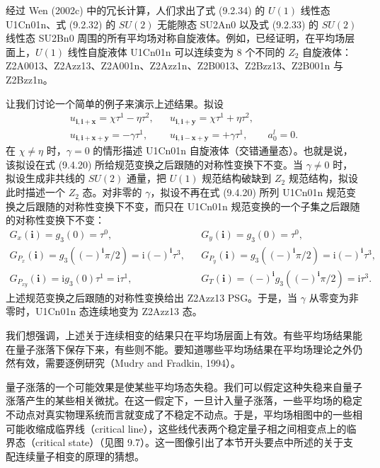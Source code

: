 经过 Wen (2002c) 中的冗长计算，人们求出了式 (9.2.34) 的 $U(1)$ 线性态 U1Cn01n、式 (9.2.32) 的 $SU(2)$ 无能隙态 SU2An0 以及式 (9.2.33) 的 $SU(2)$ 线性态 SU2Bn0 周围的所有平均场对称自旋液体。例如，已经证明，在平均场层面上，$U(1)$ 线性自旋液体 U1Cn01n 可以连续变为 8 个不同的 $Z_{2}$ 自旋液体：Z2A0013、Z2Azz13、Z2A001n、Z2Azz1n、Z2B0013、Z2Bzz13、Z2B001n 与 Z2Bzz1n。

让我们讨论一个简单的例子来演示上述结果。拟设
\begin{equation*}
\begin{array}{rcl}
u_{\pmb{i},\pmb{i}+\pmb{x}}=\chi\tau^{1}-\eta\tau^{2}, & & u_{\pmb{i},\pmb{i}+\pmb{y}}=\chi\tau^{1}+\eta\tau^{2},\\[2pt]
u_{\pmb{i},\pmb{i}+\pmb{x}+\pmb{y}}=-\gamma\tau^{1}, & & u_{\pmb{i},\pmb{i}-\pmb{x}+\pmb{y}}=+\gamma\tau^{1},\qquad a_{0}^{l}=0.
\end{array}
\tag{9.5.1}
\end{equation*}
在 $\chi\neq\eta$ 时，$\gamma=0$ 的情形描述 U1Cn01n 自旋液体（交错通量态）。也就是说，该拟设在式 (9.4.20) 所给规范变换之后跟随的对称性变换下不变。当 $\gamma\neq0$ 时，拟设生成非共线的 $SU(2)$ 通量，把 $U(1)$ 规范结构破缺到 $Z_{2}$ 规范结构，拟设此时描述一个 $Z_{2}$ 态。对非零的 $\gamma$，拟设不再在式 (9.4.20) 所列 U1Cn01n 规范变换之后跟随的对称性变换下不变，而只在 U1Cn01n 规范变换的一个子集之后跟随的对称性变换下不变：
\begin{equation*}
\begin{array}{rcl}
G_{x}(\pmb{i})=g_{3}(0)=\tau^{0}, & & G_{y}(\pmb{i})=g_{3}(0)=\tau^{0},\\[2pt]
G_{P_{x}}(\pmb{i})=g_{3}((-)^{\pmb{i}}\pi/2)=\mathrm{i}(-)^{\pmb{i}}\tau^{3}, & & G_{P_{y}}(\pmb{i})=g_{3}((-)^{\pmb{i}}\pi/2)=\mathrm{i}(-)^{\pmb{i}}\tau^{3},\\[2pt]
G_{P_{xy}}(\pmb{i})=\mathrm{i}g_{3}(0)\tau^{1}=\mathrm{i}\tau^{1}, & & G_{T}(\pmb{i})=(-)^{\pmb{i}}g_{3}((-)^{\pmb{i}}\pi/2)=\mathrm{i}\tau^{3}.
\end{array}
\end{equation*}
上述规范变换之后跟随的对称性变换给出 Z2Azz13 PSG。于是，当 $\gamma$ 从零变为非零时，U1Cn01n 态连续地变为 Z2Azz13 态。

我们想强调，上述关于连续相变的结果只在平均场层面上有效。有些平均场结果能在量子涨落下保存下来，有些则不能。要知道哪些平均场结果在平均场理论之外仍然有效，需要逐例研究（Mudry and Fradkin, 1994）。

量子涨落的一个可能效果是使某些平均场态失稳。我们可以假定这种失稳来自量子涨落产生的某些相关微扰。在这一假定下，一旦计入量子涨落，一些平均场的稳定不动点对真实物理系统而言就变成了不稳定不动点。于是，平均场相图中的一些相可能收缩成临界线（critical line），这些线代表两个稳定量子相之间相变点上的临界态（critical state）（见图 9.7）。这一图像引出了本节开头要点中所述的关于支配连续量子相变的原理的猜想。

